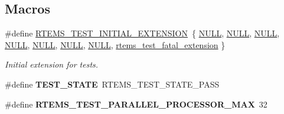 \subsection*{Macros}
\begin{DoxyCompactItemize}
\item 
\mbox{\label{group__RTEMSTest_gab0ffa504e738f7949a88fe8fd1ecf3cd}} 
\#define \mbox{\hyperlink{group__RTEMSTest_gab0ffa504e738f7949a88fe8fd1ecf3cd}{R\+T\+E\+M\+S\+\_\+\+T\+E\+S\+T\+\_\+\+I\+N\+I\+T\+I\+A\+L\+\_\+\+E\+X\+T\+E\+N\+S\+I\+ON}}~\{ \mbox{\hyperlink{bestcomm__api_8h_a872bb74de61c3689ccd5b41873fce42c}{N\+U\+LL}}, \mbox{\hyperlink{bestcomm__api_8h_a872bb74de61c3689ccd5b41873fce42c}{N\+U\+LL}}, \mbox{\hyperlink{bestcomm__api_8h_a872bb74de61c3689ccd5b41873fce42c}{N\+U\+LL}}, \mbox{\hyperlink{bestcomm__api_8h_a872bb74de61c3689ccd5b41873fce42c}{N\+U\+LL}}, \mbox{\hyperlink{bestcomm__api_8h_a872bb74de61c3689ccd5b41873fce42c}{N\+U\+LL}}, \mbox{\hyperlink{bestcomm__api_8h_a872bb74de61c3689ccd5b41873fce42c}{N\+U\+LL}}, \mbox{\hyperlink{bestcomm__api_8h_a872bb74de61c3689ccd5b41873fce42c}{N\+U\+LL}}, \mbox{\hyperlink{group__RTEMSTest_ga79fcd10b018b0b8499b54a25d88f990b}{rtems\+\_\+test\+\_\+fatal\+\_\+extension}} \}
\begin{DoxyCompactList}\small\item\em Initial extension for tests. \end{DoxyCompactList}\item 
\mbox{\label{group__RTEMSTest_gae1855ac308dcc3e281ce1c0a9bacb2bb}} 
\#define {\bfseries T\+E\+S\+T\+\_\+\+S\+T\+A\+TE}~R\+T\+E\+M\+S\+\_\+\+T\+E\+S\+T\+\_\+\+S\+T\+A\+T\+E\+\_\+\+P\+A\+SS
\item 
\mbox{\label{group__RTEMSTest_ga60fc0e719edd2c5fd4af87b577b8b5bc}} 
\#define {\bfseries R\+T\+E\+M\+S\+\_\+\+T\+E\+S\+T\+\_\+\+P\+A\+R\+A\+L\+L\+E\+L\+\_\+\+P\+R\+O\+C\+E\+S\+S\+O\+R\+\_\+\+M\+AX}~32
\end{DoxyCompactItemize}
